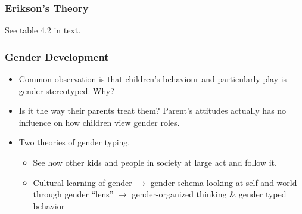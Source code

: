 \documentclass[12pt]{article}
\begin{document}
\subsubsection{Erikson's Theory}

See table 4.2 in text.

\subsubsection{Gender Development}

\begin{itemize}
    \item Common observation is that children's behaviour and particularly
        play is gender stereotyped. Why?
    \item Is it the way their parents treat them? Parent's attitudes actually
        has no influence on how children view gender roles.
    \item Two theories of gender typing.
        \begin{itemize}
            \item See how other kids and people in society at large act and
                follow it.
            \item Cultural learning of gender $\to$ gender schema looking at
                self and world through gender ``lens'' $\to$ gender-organized
                thinking \& gender typed behavior
        \end{itemize}
\end{itemize}
\end{document}
